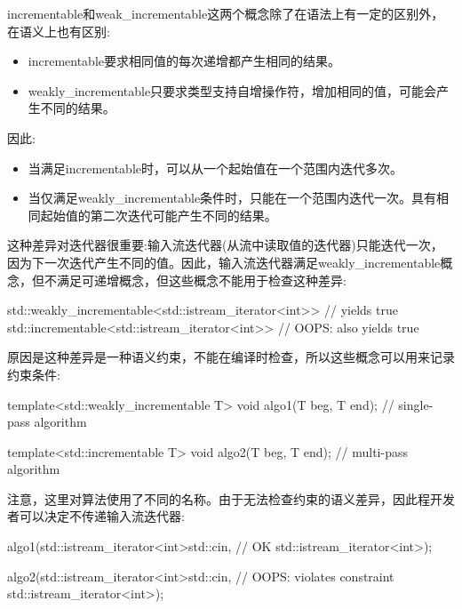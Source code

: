 
incrementable和weak\_incrementable这两个概念除了在语法上有一定的区别外，在语义上也有区别:

\begin{itemize}
\item
incrementable要求相同值的每次递增都产生相同的结果。

\item
weakly\_incrementable只要求类型支持自增操作符，增加相同的值，可能会产生不同的结果。
\end{itemize}

因此:

\begin{itemize}
\item
当满足incrementable时，可以从一个起始值在一个范围内迭代多次。

\item
当仅满足weakly\_incrementable条件时，只能在一个范围内迭代一次。具有相同起始值的第二次迭代可能产生不同的结果。
\end{itemize}

这种差异对迭代器很重要:输入流迭代器(从流中读取值的迭代器)只能迭代一次，因为下一次迭代产生不同的值。因此，输入流迭代器满足weakly\_incrementable概念，但不满足可递增概念，但这些概念不能用于检查这种差异:

\begin{cpp}
std::weakly_incrementable<std::istream_iterator<int>> // yields true
std::incrementable<std::istream_iterator<int>> // OOPS: also yields true
\end{cpp}

原因是这种差异是一种语义约束，不能在编译时检查，所以这些概念可以用来记录约束条件:

\begin{cpp}
template<std::weakly_incrementable T>
void algo1(T beg, T end); // single-pass algorithm

template<std::incrementable T>
void algo2(T beg, T end); // multi-pass algorithm
\end{cpp}

注意，这里对算法使用了不同的名称。由于无法检查约束的语义差异，因此程开发者可以决定不传递输入流迭代器:

\begin{cpp}
algo1(std::istream_iterator<int>{std::cin}, // OK
	  std::istream_iterator<int>{});

algo2(std::istream_iterator<int>{std::cin}, // OOPS: violates constraint
	  std::istream_iterator<int>{});
\end{cpp}


